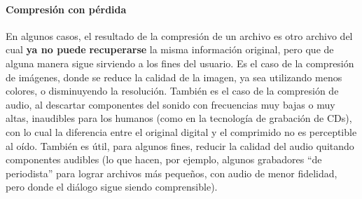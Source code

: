 \documentclass[a4paper]{article}
\begin{document}
\paragraph{Compresión con pérdida}
En algunos casos, el resultado de la compresión de un archivo es otro
archivo del cual \textbf{ya no puede} \textbf{recuperarse} la misma
información original, pero que de alguna manera sigue sirviendo a los
fines del usuario. Es el caso de la compresión de imágenes, donde
se reduce la calidad de la imagen, ya sea utilizando menos colores, o
disminuyendo la resolución. También es el caso de la compresión
de audio, al descartar componentes del sonido con frecuencias muy bajas
o muy altas, inaudibles para los humanos (como en la tecnología de
grabación de CDs), con lo cual la diferencia entre el original
digital y el comprimido no es perceptible al oído. También es
útil, para algunos fines, reducir la calidad del audio quitando
componentes audibles (lo que hacen, por ejemplo, algunos grabadores
{\textquotedblleft}de periodista{\textquotedblright} para lograr
archivos más pequeños, con audio de menor fidelidad, pero donde el
diálogo sigue siendo comprensible).
\end{document}
